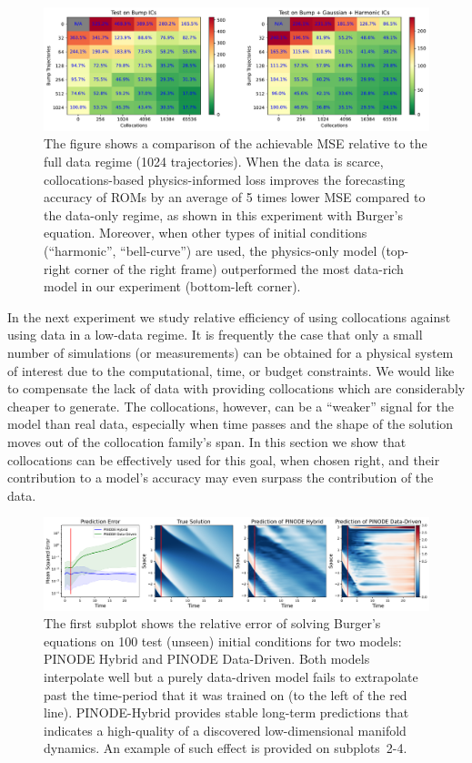 \begin{figure}
    \centering
    \includegraphics[width=\textwidth]{figures/data_vs_collocations.pdf}
    \caption{The figure shows a comparison of the achievable MSE relative to the full data regime (1024 trajectories). When the data is scarce, collocations-based physics-informed loss improves the forecasting accuracy of ROMs by an average of 5 times lower MSE compared to the data-only regime, as shown in this experiment with Burger's equation. Moreover, when other types of initial conditions (``harmonic'', ``bell-curve'') are used, the physics-only model (top-right corner of the right frame) outperformed the most data-rich model in our experiment (bottom-left corner). }
    \label{fig:burger_data_vs_collocations}
\end{figure}

In the next experiment we study relative efficiency of using collocations against using data in a low-data regime. It is frequently the case that only a small number of simulations (or measurements) can be obtained for a physical system of interest due to the computational, time, or budget constraints. We would like to compensate the lack of data with providing collocations which are considerably cheaper to generate. The collocations, however, can be a ``weaker'' signal for the model than real data, especially when time passes and the shape of the solution moves out of the collocation family's span. In this section we show that collocations can be effectively used for this goal, when chosen right, and their contribution to a model's accuracy may even surpass the contribution of the data. 




\begin{figure}
    \centering
    \includegraphics[width=\textwidth]{figures/example_burgers.pdf}
    \caption{The first subplot shows the relative error of solving Burger's equations on 100 test (unseen) initial conditions for two models: PINODE Hybrid and PINODE Data-Driven. Both models interpolate well but a purely data-driven model fails to extrapolate past the time-period that it was trained on (to the left of the red line). PINODE-Hybrid provides stable long-term predictions that indicates a high-quality of a discovered low-dimensional manifold dynamics. An example of such effect is provided on subplots~2-4.}
    \label{fig:burgers_example}
\end{figure}


